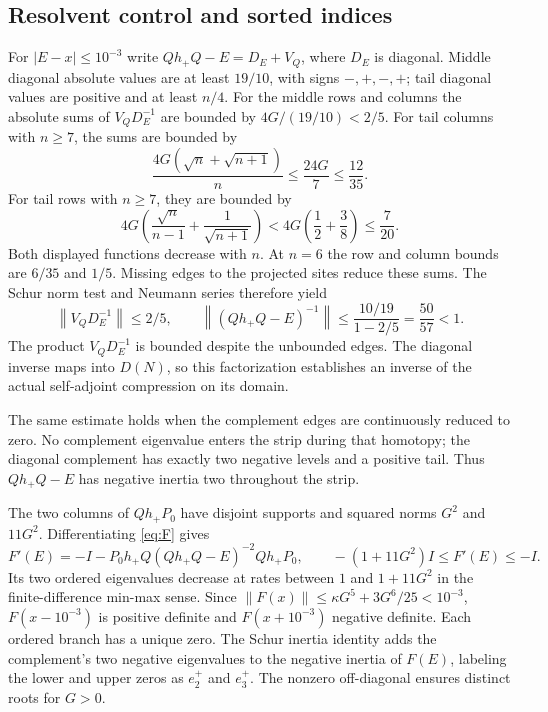 \documentclass[11pt]{article}
\newcommand{\norm}[1]{\left\|#1\right\|}
\begin{document}
\subsection{Resolvent control and sorted indices}
For $|E-x|\leq10^{-3}$ write $Qh_+Q-E=D_E+V_Q$, where $D_E$ is diagonal. Middle diagonal absolute values are at least $19/10$, with signs $-,+,-,+$; tail diagonal values are positive and at least $n/4$. For the middle rows and columns the absolute sums of $V_QD_E^{-1}$ are bounded by $4G/(19/10)<2/5$.
For tail columns with $n\geq7$, the sums are bounded by
\[
\frac{4G(\sqrt n+\sqrt{n+1})}{n}
\leq \frac{24G}{7}\leq\frac{12}{35}.
\]
For tail rows with $n\geq7$, they are bounded by
\[
4G\left(\frac{\sqrt n}{n-1}+\frac1{\sqrt{n+1}}\right)
<4G\left(\frac12+\frac38\right)\leq\frac7{20}.
\]
Both displayed functions decrease with $n$. At $n=6$ the row and column bounds are $6/35$ and $1/5$. Missing edges to the projected sites reduce these sums. The Schur norm test and Neumann series therefore yield
\begin{equation}\label{eq:resolvent}
\norm{V_QD_E^{-1}}\leq2/5,\qquad
\norm{(Qh_+Q-E)^{-1}}\leq\frac{10/19}{1-2/5}=\frac{50}{57}<1 .
\end{equation}
The product $V_QD_E^{-1}$ is bounded despite the unbounded edges. The diagonal inverse maps into $D(N)$, so this factorization establishes an inverse of the actual self-adjoint compression on its domain.

The same estimate holds when the complement edges are continuously reduced to zero. No complement eigenvalue enters the strip during that homotopy; the diagonal complement has exactly two negative levels and a positive tail. Thus $Qh_+Q-E$ has negative inertia two throughout the strip.

The two columns of $Qh_+P_0$ have disjoint supports and squared norms $G^2$ and $11G^2$. Differentiating \eqref{eq:F} gives
\begin{equation}\label{eq:slope}
F'(E)=-I-P_0h_+Q(Qh_+Q-E)^{-2}Qh_+P_0,\qquad
-(1+11G^2)I\leq F'(E)\leq-I .
\end{equation}
Its two ordered eigenvalues decrease at rates between $1$ and $1+11G^2$ in the finite-difference min-max sense.
Since $\norm{F(x)}\leq\kappa G^5+3G^6/25<10^{-3}$,
$F(x-10^{-3})$ is positive definite and $F(x+10^{-3})$ negative definite. Each ordered branch has a unique zero.
The Schur inertia identity adds the complement's two negative eigenvalues to the negative inertia of $F(E)$, labeling the lower and upper zeros as $e_2^+$ and $e_3^+$. The nonzero off-diagonal ensures distinct roots for $G>0$.
\end{document}
